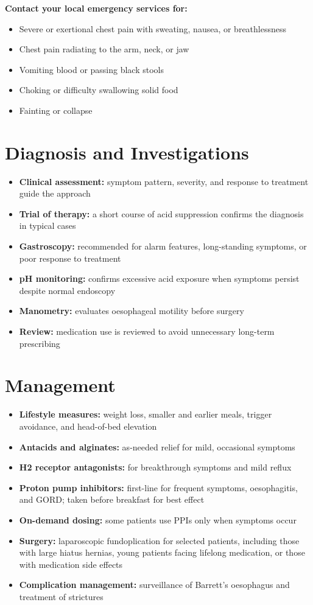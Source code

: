 \textbf{Contact your local emergency services for:}
\begin{itemize}
    \item Severe or exertional chest pain with sweating, nausea, or breathlessness
    \item Chest pain radiating to the arm, neck, or jaw
    \item Vomiting blood or passing black stools
    \item Choking or difficulty swallowing solid food
    \item Fainting or collapse
\end{itemize}

\section*{Diagnosis and Investigations}
\begin{itemize}
    \item \textbf{Clinical assessment:} symptom pattern, severity, and response to treatment guide the approach
    \item \textbf{Trial of therapy:} a short course of acid suppression confirms the diagnosis in typical cases
    \item \textbf{Gastroscopy:} recommended for alarm features, long-standing symptoms, or poor response to treatment
    \item \textbf{pH monitoring:} confirms excessive acid exposure when symptoms persist despite normal endoscopy
    \item \textbf{Manometry:} evaluates oesophageal motility before surgery
    \item \textbf{Review:} medication use is reviewed to avoid unnecessary long-term prescribing
\end{itemize}

\section*{Management}
\begin{itemize}
    \item \textbf{Lifestyle measures:} weight loss, smaller and earlier meals, trigger avoidance, and head-of-bed elevation
    \item \textbf{Antacids and alginates:} as-needed relief for mild, occasional symptoms
    \item \textbf{H2 receptor antagonists:} for breakthrough symptoms and mild reflux
    \item \textbf{Proton pump inhibitors:} first-line for frequent symptoms, oesophagitis, and GORD; taken before breakfast for best effect
    \item \textbf{On-demand dosing:} some patients use PPIs only when symptoms occur
    \item \textbf{Surgery:} laparoscopic fundoplication for selected patients, including those with large hiatus hernias, young patients facing lifelong medication, or those with medication side effects
    \item \textbf{Complication management:} surveillance of Barrett's oesophagus and treatment of strictures
\end{itemize}

